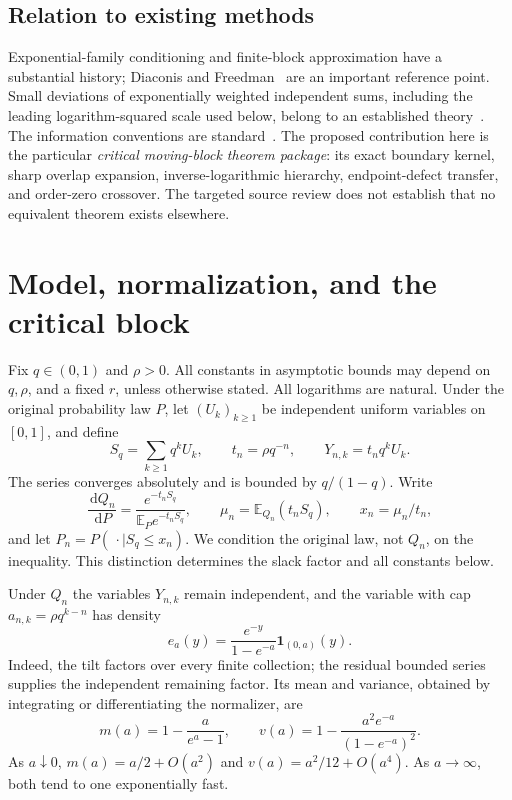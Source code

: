 \documentclass[11pt,oneside]{article}
\numberwithin{equation}{section}
\theoremstyle{plain}
\theoremstyle{definition}
\theoremstyle{remark}
\newcommand{\E}{\mathbb E}
\newcommand{\ind}{\mathbf 1}
\newcommand{\dd}{\,\mathrm d}
\begin{document}
\subsection{Relation to existing methods}
Exponential-family conditioning and finite-block approximation have a
substantial history; Diaconis and Freedman~\cite{df} are an important
reference point. Small deviations of exponentially weighted independent
sums, including the leading logarithm-squared scale used below, belong to
an established theory~\cite{aurzada}. The information conventions are
standard~\cite{renyi}. The proposed contribution here is the particular
\emph{critical moving-block theorem package}: its exact boundary kernel,
sharp overlap expansion, inverse-logarithmic hierarchy, endpoint-defect
transfer, and order-zero crossover. The targeted source review does not
establish that no equivalent theorem exists elsewhere.

\section{Model, normalization, and the critical block}
\label{sec:model}
Fix $q\in(0,1)$ and $\rho>0$. All constants in asymptotic bounds may depend
on $q,\rho$, and a fixed $r$, unless otherwise stated. All logarithms are
natural. Under the original probability law $P$, let $(U_k)_{k\ge1}$ be
independent uniform variables on $[0,1]$, and define
\begin{equation}\label{eq:series}
 S_q=\sum_{k\ge1}q^kU_k,\qquad
 t_n=\rho q^{-n},\qquad Y_{n,k}=t_nq^kU_k.
\end{equation}
The series converges absolutely and is bounded by $q/(1-q)$. Write
\begin{equation}\label{eq:tilt}
 \frac{\dd Q_n}{\dd P}
   =\frac{e^{-t_nS_q}}{\E_P e^{-t_nS_q}},\qquad
 \mu_n=\E_{Q_n}(t_nS_q),\qquad x_n=\mu_n/t_n,
\end{equation}
and let $P_n=P(\,\cdot\mid S_q\le x_n)$. We condition the original law,
not $Q_n$, on the inequality. This distinction determines the slack
factor and all constants below.

Under $Q_n$ the variables $Y_{n,k}$ remain independent, and the variable
with cap $a_{n,k}=\rho q^{k-n}$ has density
\begin{equation}\label{eq:truncexp}
 e_a(y)=\frac{e^{-y}}{1-e^{-a}}\ind_{(0,a)}(y).
\end{equation}
Indeed, the tilt factors over every finite collection; the residual
bounded series supplies the independent remaining factor. Its mean and
variance, obtained by integrating or differentiating the normalizer, are
\begin{equation}\label{eq:mv}
 m(a)=1-\frac{a}{e^a-1},\qquad
 v(a)=1-\frac{a^2e^{-a}}{(1-e^{-a})^2}.
\end{equation}
As $a\downarrow0$, $m(a)=a/2+O(a^2)$ and $v(a)=a^2/12+O(a^4)$.
As $a\to\infty$, both tend to one exponentially fast.
\end{document}

